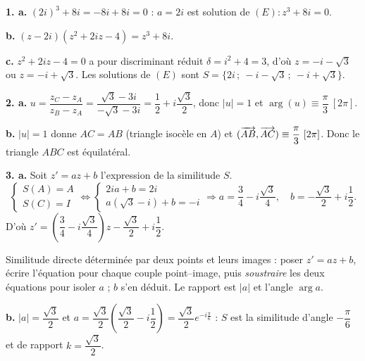 \documentclass[11pt]{article}
\begin{document}

\textbf{1. a.} $(2i)^3 + 8i = -8i + 8i = 0$ : $a = 2i$ est solution de $(E) : z^3 + 8i = 0$.

\textbf{b.} $(z - 2i)(z^2 + 2iz - 4) = z^3 + 8i$.

\textbf{c.} $z^2 + 2iz - 4 = 0$ a pour discriminant réduit $\delta = i^2 + 4 = 3$, d'où $z = -i - \sqrt{3}$ ou $z = -i + \sqrt{3}$. Les solutions de $(E)$ sont $S = \{2i\,;\ -i - \sqrt{3}\,;\ -i + \sqrt{3}\}$.

\textbf{2. a.} $u = \dfrac{z_C - z_A}{z_B - z_A} = \dfrac{\sqrt{3} - 3i}{-\sqrt{3} - 3i} = \dfrac{1}{2} + i\dfrac{\sqrt{3}}{2}$, donc $|u| = 1$ et $\arg(u) \equiv \dfrac{\pi}{3}\ [2\pi]$.

\textbf{b.} $|u| = 1$ donne $AC = AB$ (triangle isocèle en $A$) et $(\vv{AB}, \vv{AC}) \equiv \dfrac{\pi}{3}\ [2\pi]$. Donc le triangle $ABC$ est équilatéral.

\textbf{3. a.} Soit $z' = az + b$ l'expression de la similitude $S$.
\[ \begin{cases} S(A) = A \\ S(C) = I \end{cases} \Leftrightarrow \begin{cases} 2ia + b = 2i \\ a(\sqrt{3} - i) + b = -i \end{cases} \Rightarrow a = \frac{3}{4} - i\frac{\sqrt{3}}{4},\quad b = -\frac{\sqrt{3}}{2} + i\frac{1}{2}. \]
D'où $z' = \left(\dfrac{3}{4} - i\dfrac{\sqrt{3}}{4}\right)z - \dfrac{\sqrt{3}}{2} + i\dfrac{1}{2}$.

\begin{methode}
Similitude directe déterminée par deux points et leurs images : poser
$z' = az + b$, écrire l'équation pour chaque couple point--image, puis
\emph{soustraire} les deux équations pour isoler $a$ ; $b$ s'en déduit.
Le rapport est $|a|$ et l'angle $\arg a$.
\end{methode}

\textbf{b.} $|a| = \dfrac{\sqrt{3}}{2}$ et $a = \dfrac{\sqrt{3}}{2}\left(\dfrac{\sqrt{3}}{2} - i\dfrac{1}{2}\right) = \dfrac{\sqrt{3}}{2}e^{-i\frac{\pi}{6}}$ : $S$ est la similitude d'angle $-\dfrac{\pi}{6}$ et de rapport $k = \dfrac{\sqrt{3}}{2}$.
\end{document}
